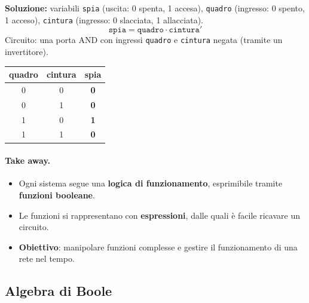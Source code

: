 \documentclass[12pt, a4paper]{article}
\begin{document}
\textbf{Soluzione:} variabili \texttt{spia} (uscita: 0 spenta, 1 accesa), \texttt{quadro} (ingresso: 0 spento, 1 acceso), \texttt{cintura} (ingresso: 0 slacciata, 1 allacciata).
\[
\texttt{spia} = \texttt{quadro} \cdot \texttt{cintura}'
\]
Circuito: una porta AND con ingressi \texttt{quadro} e \texttt{cintura} negata (tramite un invertitore).

\begin{center}
\renewcommand{\arraystretch}{1.25}
\begin{tabular}[t]{|cc||c|}
\hline
\colorbox{gray!25}{\color{black}\textbf{quadro}} & \colorbox{gray!25}{\color{black}\textbf{cintura}} & \colorbox{gray!25}{\color{black}\textbf{spia}} \\ \hline
0 & 0 & \textbf{0} \\ \hline
0 & 1 & \textbf{0} \\ \hline
1 & 0 & \textbf{1} \\ \hline
1 & 1 & \textbf{0} \\ \hline
\end{tabular}
\end{center}

\paragraph{Take away.}
\begin{itemize}
    \item Ogni sistema segue una \textbf{logica di funzionamento}, esprimibile tramite \textbf{funzioni booleane}.
    \item Le funzioni si rappresentano con \textbf{espressioni}, dalle quali è facile ricavare un circuito.
    \item \textbf{Obiettivo}: manipolare funzioni complesse e gestire il funzionamento di una rete nel tempo.
\end{itemize}

\subsection{Algebra di Boole}
\end{document}
